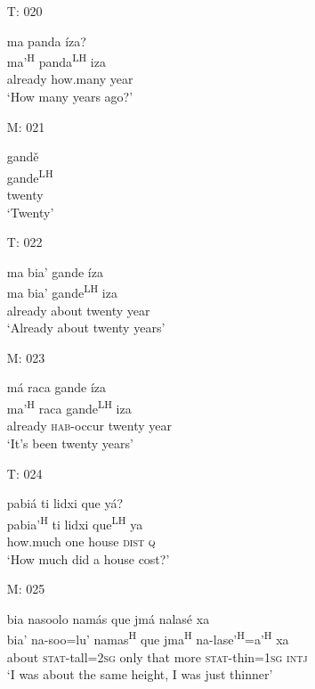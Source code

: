 \begin{itemize}
\item[T: 020]
    
\glll ma panda \'{i}za? \\
ma'\textsuperscript{H} panda\textsuperscript{LH} iza \\
already how.many year \\
\glt `How many years ago?'
 

\item[M: 021]
   
\glll gand\v{e} \\
gande\textsuperscript{LH}  \\
twenty \\
\glt `Twenty'
 

\item[T: 022]
   
\glll ma bia' gande \'{i}za  \\
ma bia' gande\textsuperscript{LH}  iza  \\
already about twenty year \\
\glt `Already about twenty years'
 

\item[M: 023]
   
\glll m\'{a} raca gande \'{i}za \\
ma'\textsuperscript{H} raca gande\textsuperscript{LH} iza \\
already \textsc{hab}-occur twenty year \\
\glt `It's been twenty years'
 


\item[T: 024]
   
\glll pabi\'{a} ti lidxi que y\'{a}? \\
pabia'\textsuperscript{H}  ti lidxi que\textsuperscript{LH}  ya \\
how.much one house \textsc{dist} \textsc{q} \\
\glt `How much did a house cost?'
 

\item[M: 025]
    
\glll bia nasoolo nam\'{a}s que jm\'{a} nalas\'{e} xa \\
bia' na-soo=lu' namas\textsuperscript{H} que jma\textsuperscript{H} na-lase'\textsuperscript{H}=a'\textsuperscript{H} xa \\ 
about \textsc{stat}-tall=\textsc{2sg} only that more \textsc{stat}-thin=\textsc{1sg} \textsc{intj} \\
\glt `I was about the same height, I was just thinner'
 


\end{itemize}
